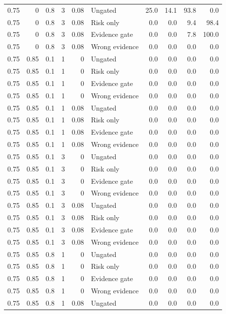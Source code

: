\begin{longtable}{rrrrrlrrrr}
0.75 & 0 & 0.8 & 3 & 0.08 & Ungated & 25.0 & 14.1 & 93.8 & 0.0\\
0.75 & 0 & 0.8 & 3 & 0.08 & Risk only & 0.0 & 0.0 & 9.4 & 98.4\\
0.75 & 0 & 0.8 & 3 & 0.08 & Evidence gate & 0.0 & 0.0 & 7.8 & 100.0\\
0.75 & 0 & 0.8 & 3 & 0.08 & Wrong evidence & 0.0 & 0.0 & 0.0 & 0.0\\
0.75 & 0.85 & 0.1 & 1 & 0 & Ungated & 0.0 & 0.0 & 0.0 & 0.0\\
0.75 & 0.85 & 0.1 & 1 & 0 & Risk only & 0.0 & 0.0 & 0.0 & 0.0\\
0.75 & 0.85 & 0.1 & 1 & 0 & Evidence gate & 0.0 & 0.0 & 0.0 & 0.0\\
0.75 & 0.85 & 0.1 & 1 & 0 & Wrong evidence & 0.0 & 0.0 & 0.0 & 0.0\\
0.75 & 0.85 & 0.1 & 1 & 0.08 & Ungated & 0.0 & 0.0 & 0.0 & 0.0\\
0.75 & 0.85 & 0.1 & 1 & 0.08 & Risk only & 0.0 & 0.0 & 0.0 & 0.0\\
0.75 & 0.85 & 0.1 & 1 & 0.08 & Evidence gate & 0.0 & 0.0 & 0.0 & 0.0\\
0.75 & 0.85 & 0.1 & 1 & 0.08 & Wrong evidence & 0.0 & 0.0 & 0.0 & 0.0\\
0.75 & 0.85 & 0.1 & 3 & 0 & Ungated & 0.0 & 0.0 & 0.0 & 0.0\\
0.75 & 0.85 & 0.1 & 3 & 0 & Risk only & 0.0 & 0.0 & 0.0 & 0.0\\
0.75 & 0.85 & 0.1 & 3 & 0 & Evidence gate & 0.0 & 0.0 & 0.0 & 0.0\\
0.75 & 0.85 & 0.1 & 3 & 0 & Wrong evidence & 0.0 & 0.0 & 0.0 & 0.0\\
0.75 & 0.85 & 0.1 & 3 & 0.08 & Ungated & 0.0 & 0.0 & 0.0 & 0.0\\
0.75 & 0.85 & 0.1 & 3 & 0.08 & Risk only & 0.0 & 0.0 & 0.0 & 0.0\\
0.75 & 0.85 & 0.1 & 3 & 0.08 & Evidence gate & 0.0 & 0.0 & 0.0 & 0.0\\
0.75 & 0.85 & 0.1 & 3 & 0.08 & Wrong evidence & 0.0 & 0.0 & 0.0 & 0.0\\
0.75 & 0.85 & 0.8 & 1 & 0 & Ungated & 0.0 & 0.0 & 0.0 & 0.0\\
0.75 & 0.85 & 0.8 & 1 & 0 & Risk only & 0.0 & 0.0 & 0.0 & 0.0\\
0.75 & 0.85 & 0.8 & 1 & 0 & Evidence gate & 0.0 & 0.0 & 0.0 & 0.0\\
0.75 & 0.85 & 0.8 & 1 & 0 & Wrong evidence & 0.0 & 0.0 & 0.0 & 0.0\\
0.75 & 0.85 & 0.8 & 1 & 0.08 & Ungated & 0.0 & 0.0 & 0.0 & 0.0\\

\end{longtable}
